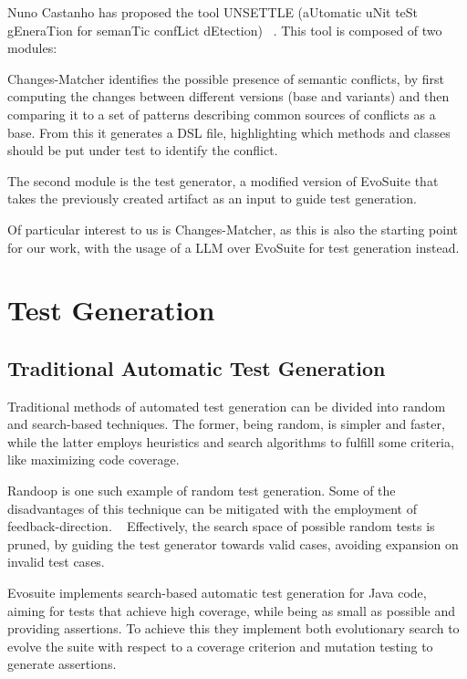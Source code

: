Nuno Castanho has proposed the tool UNSETTLE (aUtomatic uNit teSt gEneraTion for semanTic confLict dEtection) ~\citep{kn:nuno}. This tool is composed of two modules:

Changes-Matcher identifies the possible presence of semantic conflicts, by first computing the changes between different versions (base and variants) and then comparing it to a set of patterns describing common sources of conflicts as a base. From this it generates a DSL file, highlighting which methods and classes should be put under test to identify the conflict.

The second module is the test generator, a modified version of EvoSuite that takes the previously created artifact as an input to guide test generation.

Of particular interest to us is Changes-Matcher, as this is also the starting point for our work, with the usage of a LLM over EvoSuite for test generation instead.

\section{Test Generation}

\subsection{Traditional Automatic Test Generation}

Traditional methods of automated test generation can be divided into random and search-based techniques. The former, being random, is simpler and faster, while the latter employs heuristics and search algorithms to fulfill some criteria, like maximizing code coverage.

Randoop is one such example of random test generation. Some of the disadvantages of this technique can be mitigated with the employment of feedback-direction. ~\citep{kn:randoop} Effectively, the search space of possible random tests is pruned, by guiding the test generator towards valid cases, avoiding expansion on invalid test cases. ~\citep{kn:randoop}

Evosuite implements search-based automatic test generation for Java code, aiming for tests that achieve high coverage, while being as small as possible and providing assertions. To achieve this they implement both evolutionary search to evolve the suite with respect to a coverage criterion and mutation testing to generate assertions. ~\citep{kn:evosuite}

